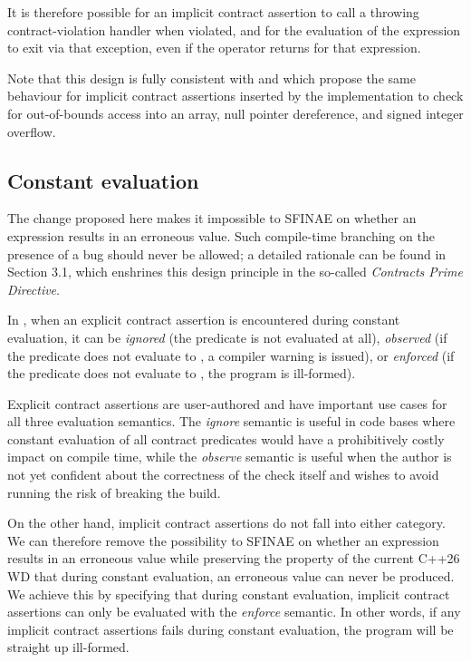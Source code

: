 It is therefore possible for an implicit contract assertion to call a throwing contract-violation handler when violated, and for the evaluation of the expression to exit via that exception, even if the  operator returns  for that expression.

Note that this design is fully consistent with \cite{P3081R1} and \cite{P3599R0} which propose the same behaviour for implicit contract assertions inserted by the implementation to check for out-of-bounds access into an array, null pointer dereference, and signed integer overflow.

\subsection{Constant evaluation}

The change proposed here makes it impossible to SFINAE on whether an expression results in an erroneous value. Such compile-time branching on the presence of a bug should never be allowed; a detailed rationale can be found in \cite{P2900R13} Section 3.1, which enshrines this design principle in the so-called \emph{Contracts Prime Directive}.

In \cite{P2900R13}, when an explicit contract assertion is encountered during constant evaluation, it can be \emph{ignored} (the predicate is not evaluated at all), \emph{observed} (if the predicate does not evaluate to , a compiler warning is issued), or \emph{enforced} (if the predicate does not evaluate to , the program is ill-formed).

Explicit contract assertions are user-authored and have important use cases for all three evaluation semantics. The \emph{ignore} semantic is useful in code bases where constant evaluation of all contract predicates would have a prohibitively costly impact on compile time, while the \emph{observe} semantic is useful when the author is not yet confident about the correctness of the check itself and wishes to avoid running the risk of breaking the build.

On the other hand, implicit contract assertions do not fall into either category. We can therefore remove the possibility to SFINAE on whether an expression results in an erroneous value while preserving the property of the current C++26 WD that during constant evaluation, an erroneous value can never be produced. We achieve this by specifying that during constant evaluation, implicit contract assertions can only be evaluated with the \emph{enforce} semantic. In other words, if any implicit contract assertions fails during constant evaluation, the program will be straight up ill-formed.

